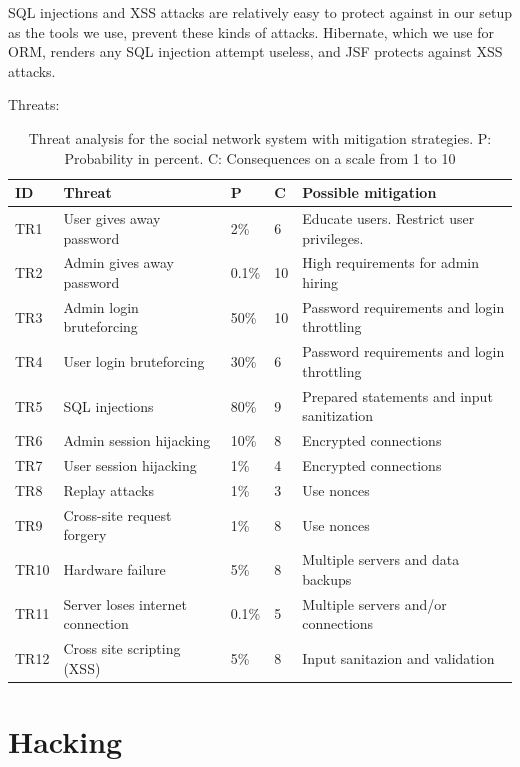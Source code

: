 \documentclass[a4paper]{article}
\begin{document}
SQL injections and XSS attacks are relatively easy to protect against in our setup as the tools we use, prevent these kinds of attacks. Hibernate, which we use for ORM, renders any SQL injection attempt useless, and JSF protects against XSS attacks.

Threats:
\begin{table}[h!]
	\begin{tabular}{| l | p{4cm} | l | l | p{5cm} |}
		\hline
		\textbf{ID} & \textbf{Threat} & \textbf{P} & \textbf{C} & \textbf{Possible mitigation} \\ \hline
		TR1 & User gives away password & 2\% & 6 & Educate users. Restrict user privileges. \\ \hline
        TR2 & Admin gives away password & 0.1\%  & 10 & High requirements for admin hiring \\ \hline
        TR3 & Admin login bruteforcing & 50\% & 10 & Password requirements and login throttling \\ \hline
        TR4 & User login bruteforcing & 30\% & 6 & Password requirements and login throttling \\ \hline
        TR5 & SQL injections & 80\% & 9 & Prepared statements and input sanitization \\ \hline
        TR6 & Admin session hijacking & 10\% & 8 & Encrypted connections \\ \hline
        TR7 & User session hijacking & 1\% & 4 & Encrypted connections \\ \hline
        TR8 & Replay attacks & 1\% & 3 & Use nonces \\ \hline
       	TR9 & Cross-site request forgery & 1\% & 8 & Use nonces \\ \hline
        TR10 & Hardware failure & 5\% & 8 & Multiple servers and data backups \\ \hline
        TR11 & Server loses internet connection & 0.1\% & 5 & Multiple servers and/or connections \\ \hline
        TR12 & Cross site scripting (XSS) & 5\% & 8 & Input sanitazion and validation \\ \hline
	\end{tabular}
	\caption{Threat analysis for the social network system with mitigation strategies. P: Probability in percent. C: Consequences on a scale from 1 to 10}
		\label{tab:threats}
\end{table}
\section{Hacking}
\end{document}
